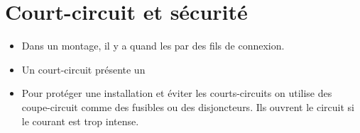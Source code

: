 \documentclass[xcolor={dvipsnames}]{beamer}
\begin{document}
\section{Court-circuit et sécurité}

\begin{frame}
\begin{mybilan}
	\begin{itemize}
		\item Dans un montage, il y a  quand les  par des fils de connexion.\pause
		\item Un court-circuit présente un \pause
		
		\item Pour protéger une installation et éviter les courts-circuits on utilise des coupe-circuit comme des fusibles ou des disjoncteurs. Ils ouvrent le circuit si le courant est trop intense.
	\end{itemize}
\end{mybilan}
\end{frame}
%
%
%	
%
%
%
%	
%	
%
%
%
%	
%			
%			


%
%	
%
%
%	
\end{document}

